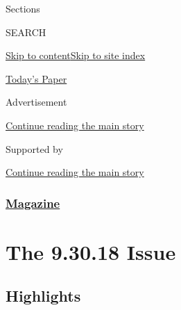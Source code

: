 Sections

SEARCH

\protect\hyperlink{site-content}{Skip to
content}\protect\hyperlink{site-index}{Skip to site index}

\href{https://myaccount.nytimes3xbfgragh.onion/auth/login?response_type=cookie\&client_id=vi}{}

\href{https://www.nytimes3xbfgragh.onion/section/todayspaper}{Today's
Paper}

Advertisement

\protect\hyperlink{after-top}{Continue reading the main story}

Supported by

\protect\hyperlink{after-sponsor}{Continue reading the main story}

\hypertarget{magazine}{%
\subsubsection{\texorpdfstring{\href{/section/magazine}{Magazine}}{Magazine}}\label{magazine}}

\hypertarget{the-93018-issue}{%
\section{The 9.30.18 Issue}\label{the-93018-issue}}

\hypertarget{highlights}{%
\subsection{Highlights}\label{highlights}}

